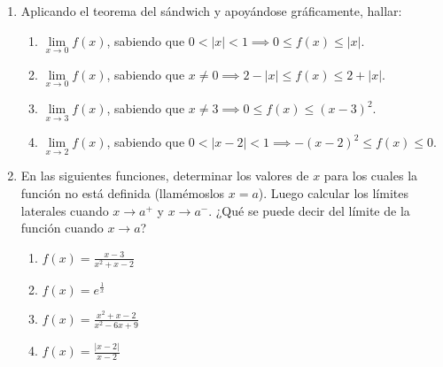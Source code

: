 \documentclass[12pt]{article}
\theoremstyle{definition}
\newtheorem*{mydef}{Definición}
\begin{document}
\begin{enumerate}
\item Aplicando el teorema del sándwich y apoyándose gráficamente, hallar:

\begin{enumerate}
	\item $\lim\limits_{x \to 0} f(x)$, sabiendo que $0 < |x| < 1 \implies 0 \leq f(x) \leq |x|$.
	\item $\lim\limits_{x \to 0} f(x)$, sabiendo que $x \neq 0 \implies 2 - |x| \leq f(x) \leq 2 + |x|$.
	\item $\lim\limits_{x \to 3} f(x)$, sabiendo que $x \neq 3 \implies 0 \leq f(x) \leq (x - 3)^2$.
	\item $\lim\limits_{x \to 2} f(x)$, sabiendo que $0 < |x - 2| < 1 \implies -(x - 2)^2 \leq f(x) \leq 0$.
\end{enumerate}

\item En las siguientes funciones, determinar los valores de $x$ para los cuales la función no está definida (llamémoslos $x = a$). Luego calcular los límites laterales cuando $x \to a^+$ y $x \to a^-$. ¿Qué se puede decir del límite de la función cuando $x \to a$?

\begin{multicols}{4}
\begin{enumerate}
	\item $f(x) = \frac{x - 3}{x^2 + x - 2}$
	\item $f(x) = e^{\frac{1}{x}}$
	\item $f(x) = \frac{x^2 + x - 2}{x^2 - 6x + 9}$
	\item $f(x) = \frac{|x - 2|}{x - 2}$
\end{enumerate}
\end{multicols}

\end{enumerate}
\end{document}
